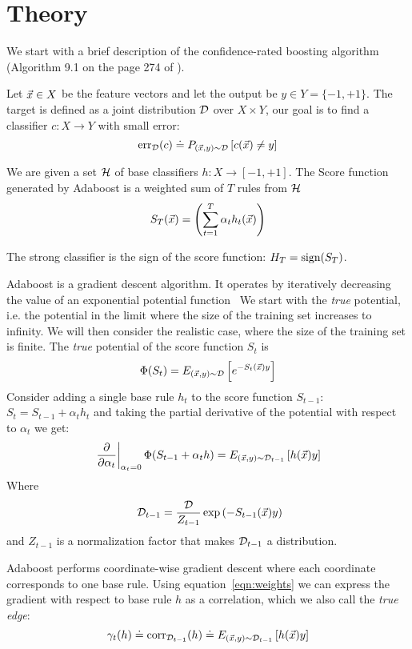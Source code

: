 \section{Theory}\label{sec:theory}
We start with a brief description of the confidence-rated boosting
algorithm (Algorithm 9.1 on the page 274 of \cite{schapire_boosting:_2012}).

Let $\vec{x} \in X$ be the feature vectors and let the output be $y \in
Y= \{-1,+1\}$. The target is defined as a joint distribution ${\cal D}$ over
$X \times Y$, our goal is to find a classifier $c: X \to Y$ with small
error:
$$\mbox{err}_{{\cal D}}(c) \doteq P_{(\vec{x},y)\sim {\cal D}}\left[c(\vec{x}) \neq y \right]$$

We are given a set $\mathcal{H}$ of base classifiers $h:X \to [-1,+1]$. The
Score function generated by Adaboost is a weighted sum of $T$ rules from
$\mathcal{H}$
\[
S_T(\vec{x}) = \left( \sum_{t=1}^T \alpha_t h_t(\vec{x}) \right)
\]

The strong classifier is the sign of the score function: $H_T =
\mbox{sign}(S_T)$.  

Adaboost is a gradient descent algorithm. It operates by iteratively
decreasing the value of an exponential potential function~\cite{Other
  potential functions have been studied, in this work we restrict
  ourselves to the original exponential potential function.}  We start
with the {\em true} potential, i.e. the potential in the limit where
the size of the training set increases to infinity. We will then
consider the realistic case, where the size of the training set is
finite.  The {\em true} potential of the score function $S_t$ is
\[
\Phi(S_t) = E_{(\vec{x},y) \sim {\cal D}}\left[e^{-S_t(\vec{x})y} \right]
\]
Consider adding a single base rule $h_t$ to the score function
$S_{t-1}$:
$S_t=S_{t-1}+\alpha_t h_t$ and taking the partial derivative of the potential with respect
to $\alpha_t$ we get:
\begin{equation} \label{eqn:weights}
\left. \frac{\partial}{\partial \alpha_t}\right|_{\alpha_t=0} \Phi(S_{t-1}+\alpha_t h)
= E_{(\vec{x},y) \sim {\cal D}_{t-1}}\left[h(\vec{x}) y \right]
\end{equation}
Where
\begin{equation} ~\label{eqn:Dt}
{\cal D}_{t-1} = \frac{{\cal D}}{Z_{t-1}} \exp\left( -S_{t-1}(\vec{x})y \right)
\end{equation}
and $Z_{t-1}$ is a normalization factor that makes ${\cal D}_{t-1}$ a
distribution.

Adaboost performs coordinate-wise gradient descent where each
coordinate corresponds to one base rule. Using
equation~\ref{eqn:weights} we can express the gradient with respect to
base rule $h$ as a correlation, which we also call the {\em true edge}: 
\begin{equation} \label{eqn:true-edge}
\gamma_{t}(h) \doteq \mbox{corr}_{{\cal D}_{t-1}}(h) \doteq E_{(\vec{x},y) \sim {\cal D}_{t-1}}\left[h(\vec{x}) y \right]
\end{equation}

